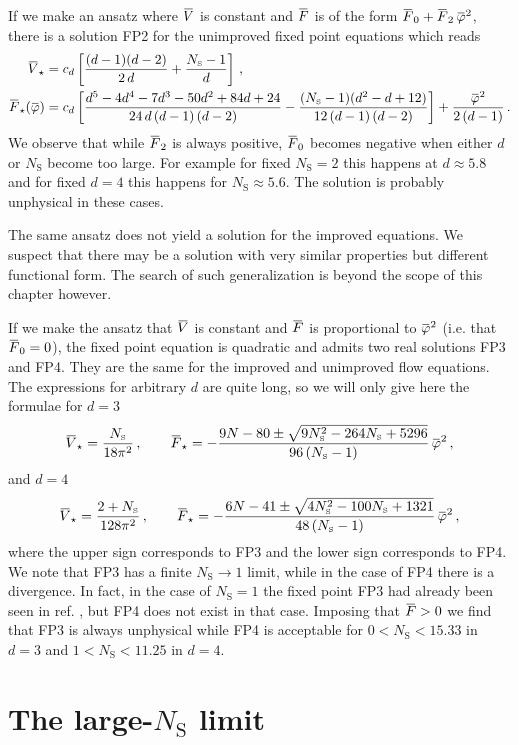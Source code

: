 \documentclass[11pt]{book} %
\newcommand{\overbar}[1]{\mkern 1.5mu\overline{\mkern-1.5mu#1\mkern-1.5mu}\mkern 1.5mu}
\newcommand\NS{ N_{\scriptscriptstyle{\mathrm{S}}} }
\newcommand{\bV}{\overbar V}
\newcommand{\bF}{\overbar F}
\newcommand{\bVstar}{\bV_\star}
\newcommand{\bFstar}{\bF_\star}
\newcommand{\bp}{\overbar \varphi}
\numberwithin{equation}{chapter}
\begin{document}
If we make an ansatz where $\bV$ is constant and $\bF$ is of the
form $\bF_0 + \bF_2 \, \bp^2$, there is a solution FP2
for the unimproved fixed point equations which reads
\begin{align}
  \bVstar          &= c_d \left[\frac{(d-1) (d-2)}{2 \, d}+\frac{\NS-1}{d}\right] \,, \\
  \bFstar(\bp) &= c_d \left[ \frac{d^5-4 d^4-7 d^3-50 d^2+84 d+24}{24 \, d \, (d-1) \, (d-2)}
                  - \frac{(\NS-1)(d^2-d+12)}{12 \, (d-1) \, (d-2)}\right]
                  + \frac{\bp^2}{2 \, (d-1)}\,.
\end{align}
We observe that while $\bF_2$ is always positive,
$\bF_0$ becomes negative when either $d$ or $\NS$ become
too large. For example for fixed $\NS=2$ this happens at $d\approx 5.8$
and for fixed $d=4$ this happens for $\NS\approx 5.6$.
The solution is probably unphysical in these cases.

The same ansatz does not yield a solution for the improved equations.
We suspect that there may be a solution
with very similar properties but different functional form.
The search of such generalization is beyond the scope of this chapter however.

If we make the ansatz that $\bV$ is constant and $\bF$ is proportional
to $\bp^2$ (i.e. that $\bF_0=0$), the fixed point equation is quadratic and admits two
real solutions FP3 and FP4.
They are the same for the improved and unimproved flow equations.
The expressions for arbitrary $d$ are quite long, so
we will only give here the formulae for $d=3$
\begin{align}
  \bVstar = \frac{\NS}{18\pi^2} \,, \qquad
  \bFstar = - \frac{ 9N - 80 \pm \sqrt{9\NS^2-264\NS+5296} }{ 96 \, (\NS-1) } \, \bp^2 \,,
\end{align}
and $d=4$
\begin{align}
  \bVstar = \frac{2+\NS}{128\pi^2} \,, \qquad
  \bFstar = - \frac{ 6N - 41 \pm \sqrt{4\NS^2-100\NS+1321} }{ 48 \, (\NS-1) } \, \bp^2 \,,
\end{align}
where the upper sign corresponds to FP3
and the lower sign corresponds to FP4.
We note that FP3 has a finite $\NS\to1$ limit,
while in the case of FP4 there is a divergence.
In fact, in the case of $\NS=1$ the fixed point FP3 had already been seen
in ref. \cite{Percacci:2015wwa}, but FP4 does not exist in that case.
Imposing that $\bF>0$ we find that FP3 is always unphysical
while FP4 is acceptable for $0<\NS<15.33$ in $d=3$
and $1<\NS<11.25$ in $d=4$.


\section{The large-$\NS$ limit}
\end{document}
